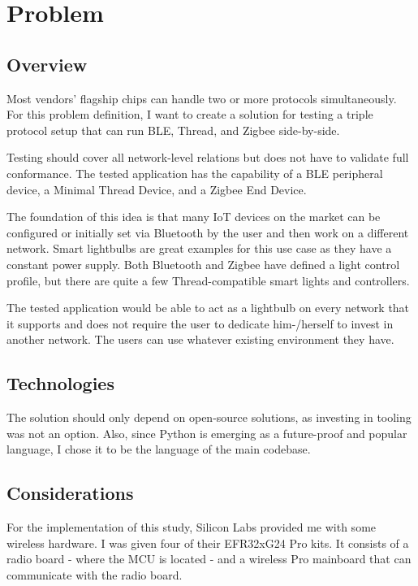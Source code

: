 \chapter{Problem}
\label{chap:problem}

\section{Overview}
\label{sec:prob:ov}

Most vendors' flagship chips can handle two or more protocols simultaneously. For this problem definition, I want to create a solution for testing a triple protocol setup that can run BLE, Thread, and Zigbee side-by-side.

Testing should cover all network-level relations but does not have to validate full conformance. The tested application has the capability of a BLE peripheral device, a Minimal Thread Device, and a Zigbee End Device.

The foundation of this idea is that many IoT devices on the market can be configured or initially set via Bluetooth by the user and then work on a different network. Smart lightbulbs are great examples for this use case as they have a constant power supply. Both Bluetooth and Zigbee have defined a light control profile, but there are quite a few Thread-compatible smart lights and controllers.

The tested application would be able to act as a lightbulb on every network that it supports and does not require the user to dedicate him-/herself to invest in another network. The users can use whatever existing environment they have.


\section{Technologies}
\label{sec:prob:tech}

The solution should only depend on open-source solutions, as investing in tooling was not an option. Also, since Python is emerging as a future-proof and popular language, I chose it to be the language of the main codebase.

\section{Considerations}
\label{sec:prob:cons}

For the implementation of this study, Silicon Labs provided me with some wireless hardware\cite{silabs_wpk:2023}. I was given four of their EFR32xG24 Pro kits. It consists of a radio board - where the MCU is located - and a wireless Pro mainboard that can communicate with the radio board.

